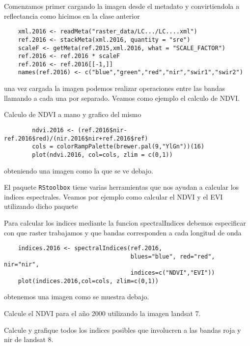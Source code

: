 \documentclass[a4paper]{article}
\begin{document}
Comenzamos primer cargando la imagen desde el metadato y convirtiendola a
reflectancia como hicimos en la clase anterior

\begin{lstlisting}
    xml.2016 <- readMeta("raster_data/LC.../LC....xml")
    ref.2016 <- stackMeta(xml.2016, quantity = "sre")
    scaleF <- getMeta(ref.2015,xml.2016, what = "SCALE_FACTOR")
    ref.2016 <- ref.2016 * scaleF
    ref.2016 <- ref.2016[[-1,]]
    names(ref.2016) <- c("blue","green","red","nir","swir1","swir2")
\end{lstlisting}

una vez cargada la imagen podemos realizar operaciones entre las bandas llamando
a cada una por separado. Veamos como ejemplo el calculo de NDVI\@.

\begin{exa}
    Calculo de NDVI a mano y grafico del mismo
    \begin{lstlisting}
        ndvi.2016 <- (ref.2016$nir-ref.2016$red)/(nir.2016$nir+ref.2016$ref)
        cols = colorRampPalette(brewer.pal(9,"YlGn"))(16)
        plot(ndvi.2016, col=cols, zlim = c(0,1))
    \end{lstlisting}
    obteniendo una imagen como la que se ve debajo.
\end{exa}

El paquete \texttt{RStoolbox} tiene varias herramientas que nos ayudan a
calcular los indices espectrales. Veamos por ejemplo como calcular el NDVI y el
EVI utilizando dicho paquete

\begin{exa}
    Para calcular los indices mediante la funcion spectralIndices debemos
    especificar con que raster trabajamos y que bandas corresponden a cada
    longitud de onda
    \begin{lstlisting}
    indices.2016 <- spectralIndices(ref.2016, 
                                    blues="blue", red="red", nir="nir", 
                                    indices=c("NDVI","EVI"))
    plot(indices.2016,col=cols, zlim=c(0,1))
    \end{lstlisting}
    obtenemos una imagen como se muestra debajo.
\end{exa}

\begin{act}
    Calcule el NDVI para el año 2000 utilizando la imagen landsat 7.
\end{act}

\begin{act}
    Calcule y grafique todos los indices posibles que involucren a las bandas
    roja y nir de landsat 8. 
\end{act}
\end{document}
